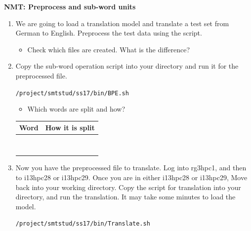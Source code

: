 \documentclass[12pt,fleqn]{article}
\begin{document}
\textbf{NMT: Preprocess and sub-word units} \\ 
\begin{enumerate}


\item We are going to load a translation model and translate a test set from German to English. Preprocess the test data using the script. 


\begin{itemize} 
 \item Check which files are created. What is the difference? 
\end{itemize}



\item  Copy the sub-word operation script into your directory and run it for the preprocessed file. 

\texttt{/project/smtstud/ss17/bin/BPE.sh} 

\begin{itemize} 
 \item Which words are split and how?
\end{itemize}

\begin{table}[ht] 
 \begin{center} 
\begin{tabular}{p{3cm}|p{5cm}} 
 Word & How it is split \\  \hline 
 & \\ 
 & \\ 
 & \\ 
 & \\ 
 & \\ 
 & \\ 
 & \\ 
 & \\ 
\end{tabular}

 \end{center}

\end{table}


\item Now you have the preprocessed file to translate. Log into rg3hpc1, and then to i13hpc28 or i13hpc29. Once you are in either i13hpc28 or i13hpc29, Move back into your working directory. Copy the script for translation into your directory, and run the translation. It may take some minutes to load the model. 

\texttt{/project/smtstud/ss17/bin/Translate.sh} 


\end{enumerate}
\end{document}
